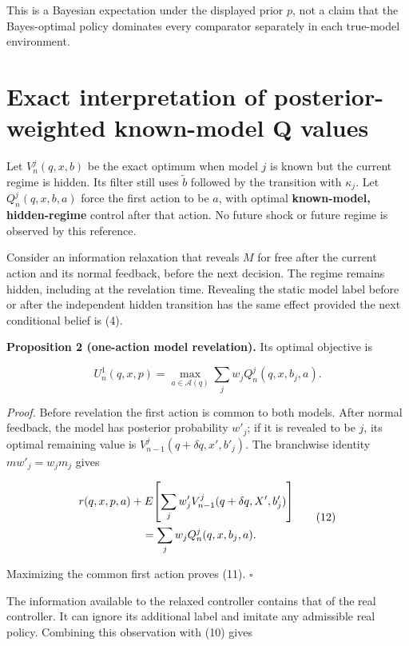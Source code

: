 \documentclass[10pt,a4paper]{article}
\begin{document}
This is a Bayesian expectation under the displayed prior $p$, not a claim
that the Bayes-optimal policy dominates every comparator separately in each
true-model environment.

\section{Exact interpretation of posterior-weighted known-model Q values}

Let $V^j_n(q,x,b)$ be the exact optimum when model $j$ is known but the
current regime is hidden. Its filter still uses $\widetilde b$ followed by
the transition with $\kappa_j$. Let $Q^j_n(q,x,b,a)$ force the first
action to be $a$, with optimal \textbf{known-model, hidden-regime} control after
that action. No future shock or future regime is observed by this reference.

Consider an information relaxation that reveals $M$ for free after the
current action and its normal feedback, before the next decision. The regime
remains hidden, including at the revelation time. Revealing the static model
label before or after the independent hidden transition has the same effect
provided the next conditional belief is (4).

\textbf{Proposition 2 (one-action model revelation).} Its optimal objective is

\begin{equation}
U^1_n(q,x,p)=\max_{a\in\mathcal A(q)}
\sum_j w_j Q^j_n(q,x,b_j,a).
\tag{11}
\end{equation}

\emph{Proof.} Before revelation the first action is common to both models. After
normal feedback, the model has posterior probability $w'_j$; if it is
revealed to be $j$, its optimal remaining value is
$V^j_{n-1}(q+\delta q,x',b'_j)$. The branchwise identity
$m w'_j=w_jm_j$ gives

\begin{equation}
\begin{split}
&r(q,x,p,a)+E\!\left[\sum_jw'_j
 V^j_{n-1}(q+\delta q,X',b'_j)\right]\\
&\hspace{20mm}=\sum_jw_jQ^j_n(q,x,b_j,a).
\end{split}
\tag{12}
\end{equation}

Maximizing the common first action proves (11). $\square$

The information available to the relaxed controller contains that of the real
controller. It can ignore its additional label and imitate any admissible
real policy. Combining this observation with (10) gives
\end{document}
